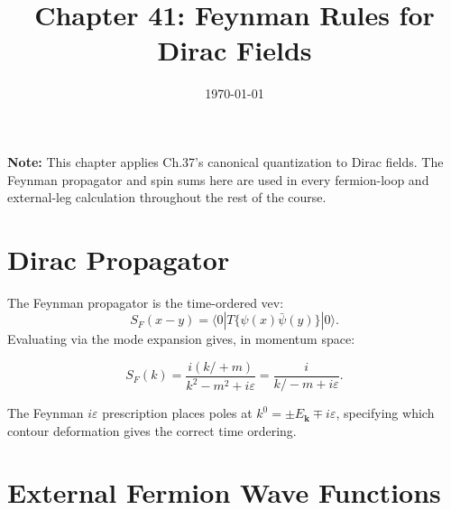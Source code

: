 \documentclass[12pt]{article}
\begin{document}
\title{Chapter 41: Feynman Rules for Dirac Fields}
\date{\today}
\maketitle

\begin{mdframed}[backgroundcolor=blue!5]
\textbf{Note:} This chapter applies Ch.37's canonical quantization to Dirac
fields. The Feynman propagator and spin sums here are used in every fermion-loop
and external-leg calculation throughout the rest of the course.
\end{mdframed}

\section{Dirac Propagator}\label{sec:propagator}

The Feynman propagator is the time-ordered vev:
\begin{equation}
S_F(x-y) = \langle0| T\{\psi(x)\bar\psi(y)\}|0\rangle .
\end{equation}
Evaluating via the mode expansion gives, in momentum space:
\begin{mdframed}[backgroundcolor=green!5]
\begin{equation}
S_F(k) = \frac{i(k\!\!\!/+m)}{k^2-m^2+i\varepsilon}
      = \frac{i}{k\!\!\!/-m+i\varepsilon} .
\tag{39.3}
\end{equation}
\end{mdframed}

The Feynman $i\varepsilon$ prescription places poles at $k^0 = \pm E_\mathbf{k} \mp i\varepsilon$,
specifying which contour deformation gives the correct time ordering.

\section{External Fermion Wave Functions}\label{sec:external}
\end{document}

